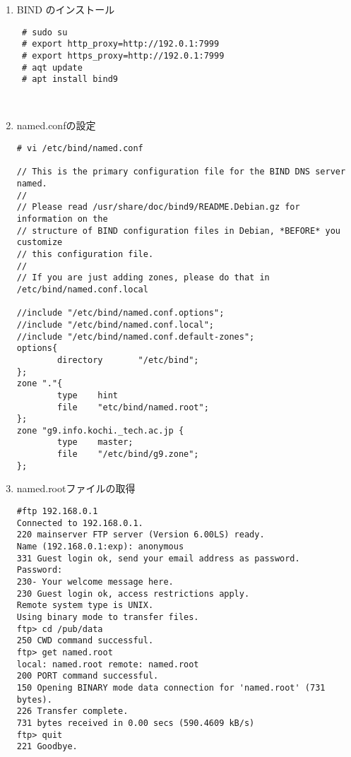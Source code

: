\documentclass[a4j,titlepage]{jarticle}
\begin{document}
\begin{enumerate}
\item BIND のインストール
  
  \begin{center}
    \begin{screen}
\begin{verbatim}
 # sudo su
 # export http_proxy=http://192.0.1:7999
 # export https_proxy=http://192.0.1:7999
 # aqt update
 # apt install bind9  
\end{verbatim}
    \end{screen}
\end{center}　
\item named.confの設定

  \begin{center}
    \begin{screen}
\begin{verbatim}
# vi /etc/bind/named.conf

// This is the primary configuration file for the BIND DNS server named.
//
// Please read /usr/share/doc/bind9/README.Debian.gz for information on the 
// structure of BIND configuration files in Debian, *BEFORE* you customize 
// this configuration file.
//
// If you are just adding zones, please do that in /etc/bind/named.conf.local

//include "/etc/bind/named.conf.options";
//include "/etc/bind/named.conf.local";
//include "/etc/bind/named.conf.default-zones";
options{
        directory       "/etc/bind";
};
zone "."{
        type    hint
        file    "etc/bind/named.root";
};
zone "g9.info.kochi._tech.ac.jp {
        type    master;
        file    "/etc/bind/g9.zone";
};
\end{verbatim}
    \end{screen}

  \end{center}
\item named.rootファイルの取得
  \begin{center}
  \begin{screen}
\begin{verbatim}
#ftp 192.168.0.1
Connected to 192.168.0.1.
220 mainserver FTP server (Version 6.00LS) ready.
Name (192.168.0.1:exp): anonymous
331 Guest login ok, send your email address as password.
Password:
230- Your welcome message here.
230 Guest login ok, access restrictions apply.
Remote system type is UNIX.
Using binary mode to transfer files.
ftp> cd /pub/data
250 CWD command successful.
ftp> get named.root
local: named.root remote: named.root
200 PORT command successful.
150 Opening BINARY mode data connection for 'named.root' (731 bytes).
226 Transfer complete.
731 bytes received in 0.00 secs (590.4609 kB/s)
ftp> quit
221 Goodbye.


\end{verbatim}
\end{screen}
\end{center}
\end{enumerate}
\end{document}
